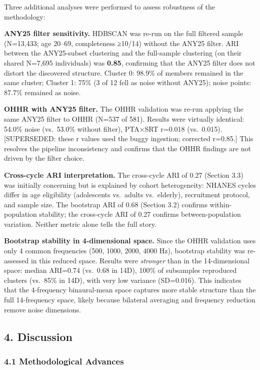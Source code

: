 \documentclass[
]{article}
\begin{document}
Three additional analyses were performed to assess robustness of the
methodology:

\textbf{ANY25 filter sensitivity.} HDBSCAN was re-run on the full filtered
sample (N=13,433; age 20--69, completeness ≥10/14) without the ANY25 filter. ARI
between the ANY25-subset clustering and the full-sample clustering (on their
shared N=7,695 individuals) was \textbf{0.85}, confirming that the ANY25 filter
does not distort the discovered structure. Cluster 0: 98.9\% of members remained
in the same cluster; Cluster 1: 75\% (3 of 12 fell as noise without ANY25);
noise points: 87.7\% remained as noise.

\textbf{OHHR with ANY25 filter.} The OHHR validation was re-run applying the
same ANY25 filter to OHHR (N=537 of 581). Results were virtually identical:
54.0\% noise (vs.~53.0\% without filter), PTA×SRT r=0.018 (vs.~0.015). [SUPERSEDED: these r values used the buggy ingestion; corrected r=0.85.] This
resolves the pipeline inconsistency and confirms that the OHHR findings are not
driven by the filter choice.

\textbf{Cross-cycle ARI interpretation.} The cross-cycle ARI of 0.27 (Section
3.3) was initially concerning but is explained by cohort heterogeneity: NHANES
cycles differ in age eligibility (adolescents vs.~adults vs.~elderly),
recruitment protocol, and sample size. The bootstrap ARI of 0.68 (Section 3.2)
confirms within-population stability; the cross-cycle ARI of 0.27 confirms
between-population variation. Neither metric alone tells the full story.

\textbf{Bootstrap stability in 4-dimensional space.} Since the OHHR validation
uses only 4 common frequencies (500, 1000, 2000, 4000 Hz), bootstrap stability
was re-assessed in this reduced space. Results were \emph{stronger} than in the
14-dimensional space: median ARI=0.74 (vs.~0.68 in 14D), 100\% of subsamples
reproduced clusters (vs.~85\% in 14D), with very low variance (SD=0.016). This
indicates that the 4-frequency binaural-mean space captures more stable
structure than the full 14-frequency space, likely because bilateral averaging
and frequency reduction remove noise dimensions.

\subsection{4. Discussion}\label{discussion}

\subsubsection{4.1 Methodological Advances}\label{methodological-advances}
\end{document}
